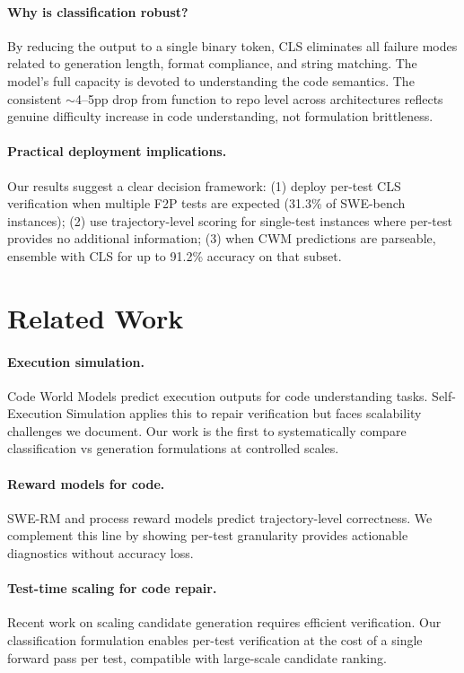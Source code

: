 \documentclass[11pt]{article}
\begin{document}
\paragraph{Why is classification robust?} By reducing the output to a single binary token, CLS eliminates all failure modes related to generation length, format compliance, and string matching. The model's full capacity is devoted to understanding the code semantics. The consistent $\sim$4--5pp drop from function to repo level across architectures reflects genuine difficulty increase in code understanding, not formulation brittleness.

\paragraph{Practical deployment implications.} Our results suggest a clear decision framework: (1) deploy per-test CLS verification when multiple F2P tests are expected (31.3\% of SWE-bench instances); (2) use trajectory-level scoring for single-test instances where per-test provides no additional information; (3) when CWM predictions are parseable, ensemble with CLS for up to 91.2\% accuracy on that subset.

\section{Related Work}

\paragraph{Execution simulation.} Code World Models \citep{gu2024cruxeval} predict execution outputs for code understanding tasks. Self-Execution Simulation applies this to repair verification but faces scalability challenges we document. Our work is the first to systematically compare classification vs generation formulations at controlled scales.

\paragraph{Reward models for code.} SWE-RM and process reward models predict trajectory-level correctness. We complement this line by showing per-test granularity provides actionable diagnostics without accuracy loss.

\paragraph{Test-time scaling for code repair.} Recent work on scaling candidate generation requires efficient verification. Our classification formulation enables per-test verification at the cost of a single forward pass per test, compatible with large-scale candidate ranking.
\end{document}
